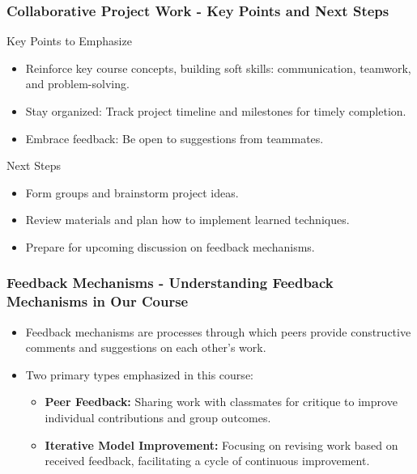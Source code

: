 \documentclass[aspectratio=169]{beamer}
\begin{document}
\begin{frame}[fragile]
    \frametitle{Collaborative Project Work - Key Points and Next Steps}
    \begin{block}{Key Points to Emphasize}
        \begin{itemize}
            \item Reinforce key course concepts, building soft skills: communication, teamwork, and problem-solving.
            \item Stay organized: Track project timeline and milestones for timely completion.
            \item Embrace feedback: Be open to suggestions from teammates.
        \end{itemize}
    \end{block}

    \begin{block}{Next Steps}
        \begin{itemize}
            \item Form groups and brainstorm project ideas.
            \item Review materials and plan how to implement learned techniques.
            \item Prepare for upcoming discussion on feedback mechanisms.
        \end{itemize}
    \end{block}
\end{frame}

\begin{frame}[fragile]
    \frametitle{Feedback Mechanisms - Understanding Feedback Mechanisms in Our Course}
    
    \begin{itemize}
        \item Feedback mechanisms are processes through which peers provide constructive comments and suggestions on each other's work.
        \item Two primary types emphasized in this course:
        \begin{itemize}
            \item \textbf{Peer Feedback:} Sharing work with classmates for critique to improve individual contributions and group outcomes.
            \item \textbf{Iterative Model Improvement:} Focusing on revising work based on received feedback, facilitating a cycle of continuous improvement.
        \end{itemize}
    \end{itemize}
\end{frame}
\end{document}
